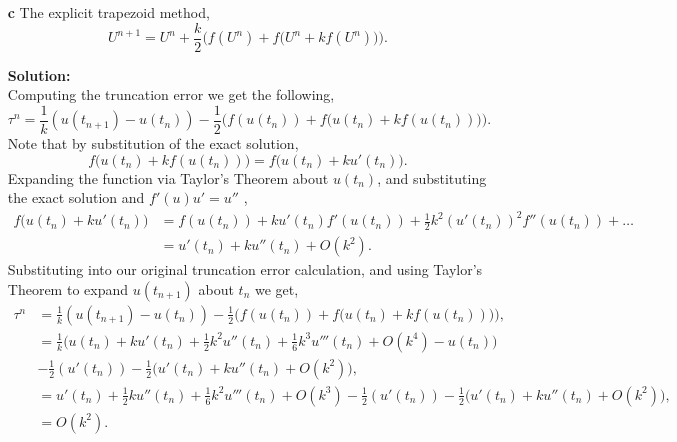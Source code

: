 \documentclass[12pt]{article}
\makeatletter
\theoremstyle{homework}
\newenvironment{exercise}[1]
{\def\@currentlabel{#1}\exercisecore}
{\endexercisecore}
\newcommand{\localhead}[1]{\par\smallskip\noindent\textbf{#1}\nobreak\\}%
\newcommand\solution{\localhead{Solution:}}
\makeatother
\begin{document}
\begin{exercise}{Problem P28}
\begin{enumerate}
    \item[\textbf{c}] The explicit trapezoid method, 
    \begin{equation*}
      U^{n+1} = U^n + \frac{k}{2}\biggl(f(U^n) + f\biggl(U^n + kf(U^n)\biggr)\biggr).
    \end{equation*}
    \solution Computing the truncation error we get the following, 
    \begin{equation*}
      \tau^n = \frac{1}{k} \left(u(t_{n+1}) - u(t_n)\right) - \frac{1}{2}\biggl(f(u(t_n)) + f\biggl(u(t_n) + kf(u(t_n))\biggr)\biggr).
    \end{equation*}
    Note that by substitution of the exact solution, 
    \begin{equation*}
      f\biggl(u(t_n) + kf(u(t_n))\biggr) =  f\biggl(u(t_n) + ku'(t_n)\biggr).
    \end{equation*}
    Expanding the function via Taylor's Theorem about $u(t_n)$, and substituting the exact solution and $f'(u)u' = u''$ , 
    \begin{align*}
      f\biggl(u(t_n) + ku'(t_n)\biggr) &= f(u(t_n)) + ku'(t_n)f'(u(t_n)) + \frac{1}{2}k^2(u'(t_n))^2f''(u(t_n)) + \dots \\
      &= u'(t_n) + ku''(t_n) + O(k^2).
    \end{align*}
    Substituting into our original truncation error calculation, and using Taylor's Theorem to expand $u(t_{n+1})$ about $t_n$ we get, 
    \begin{align*}
      \tau^n &= \frac{1}{k} \left(u(t_{n+1}) - u(t_n)\right) - \frac{1}{2}\biggl(f(u(t_n)) + f\biggl(u(t_n) + kf(u(t_n))\biggr)\biggr),\\
      &=\frac{1}{k}\biggl(u(t_n) + ku'(t_n) + \frac{1}{2}k^2u''(t_n) + \frac{1}{6}k^3u'''(t_n) + O(k^4) - u(t_n)\biggr) \\
      &- \frac{1}{2}(u'(t_n)) - \frac{1}{2} \biggl( u'(t_n) + ku''(t_n) + O(k^2)\biggr),\\
      &= u'(t_n) + \frac{1}{2}ku''(t_n) + \frac{1}{6}k^2u'''(t_n) + O(k^3) - \frac{1}{2}(u'(t_n)) - \frac{1}{2}\biggl( u'(t_n) + ku''(t_n) + O(k^2)\biggr),\\
      &= O(k^2).
    \end{align*}
  \end{enumerate} 
  
\end{exercise}
\end{document}
